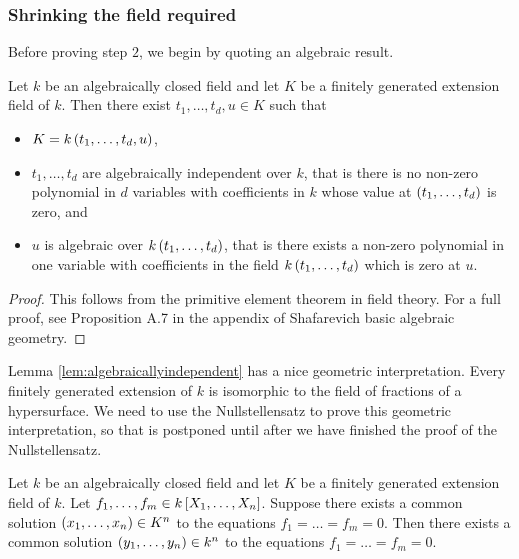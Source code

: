 \pagebreak

\subsubsection{Shrinking the field required}

Before proving step $ 2 $, we begin by quoting an algebraic result.

\begin{lemma}
\label{lem:algebraicallyindependent}
Let $ k $ be an algebraically closed field and let $ K $ be a finitely generated extension field of $ k $. Then there exist $ t_1, \dots, t_d, u \in K $ such that
\begin{itemize}
\item $ K = k\br{t_1, \dots, t_d, u} $,
\item $ t_1, \dots, t_d $ are algebraically independent over $ k $, that is there is no non-zero polynomial in $ d $ variables with coefficients in $ k $ whose value at $ \br{t_1, \dots, t_d} $ is zero, and
\item $ u $ is algebraic over $ k\br{t_1, \dots, t_d} $, that is there exists a non-zero polynomial in one variable with coefficients in the field $ k\br{t_1, \dots, t_d} $ which is zero at $ u $.
\end{itemize}
\end{lemma}

\begin{proof}
This follows from the primitive element theorem in field theory. For a full proof, see Proposition A.7 in the appendix of Shafarevich basic algebraic geometry.
\end{proof}

Lemma \ref{lem:algebraicallyindependent} has a nice geometric interpretation. Every finitely generated extension of $ k $ is isomorphic to the field of fractions of a hypersurface. We need to use the Nullstellensatz to prove this geometric interpretation, so that is postponed until after we have finished the proof of the Nullstellensatz.

\begin{theorem}
\label{thm:shrinkingfield}
Let $ k $ be an algebraically closed field and let $ K $ be a finitely generated extension field of $ k $. Let $ f_1, \dots, f_m \in k\sbr{X_1, \dots, X_n} $. Suppose there exists a common solution $ \br{x_1, \dots, x_n} \in K^n $ to the equations $ f_1 = \dots = f_m = 0 $. Then there exists a common solution $ \br{y_1, \dots, y_n} \in k^n $ to the equations $ f_1 = \dots = f_m = 0 $.
\end{theorem}

